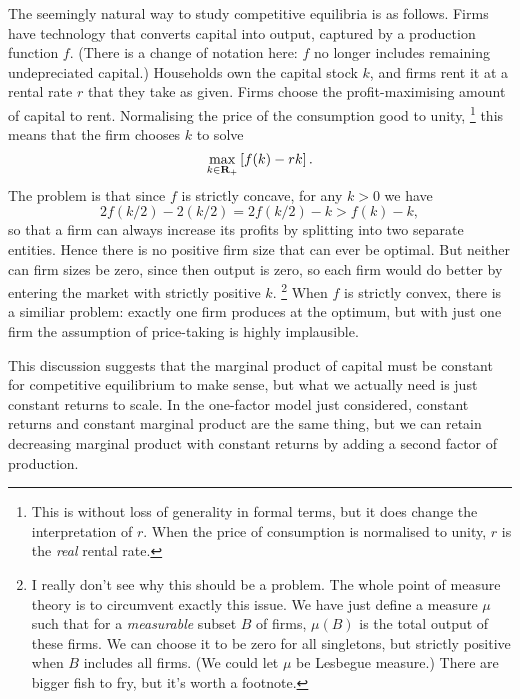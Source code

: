 \documentclass[11pt,letterpaper,reqno,oneside]{article}
\begin{document}
The seemingly natural way to study competitive equilibria is as follows. Firms have technology that converts capital into output, captured by a production function $f$. (There is a change of notation here: $f$ no longer includes remaining undepreciated capital.) Households own the capital stock $k$, and firms rent it at a rental rate $r$ that they take as given. Firms choose the profit-maximising amount of capital to rent. Normalising the price of the consumption good to unity,%
	\footnote{This is without loss of generality in formal terms, but it does change the interpretation of $r$. When the price of consumption is normalised to unity, $r$ is the \emph{real} rental rate.}
this means that the firm chooses $k$ to solve
%
\begin{equation*}
	\max_{k \in \mathbf{R}_+} \left[ f(k) - r k \right] .
\end{equation*}
%
The problem is that since $f$ is strictly concave, for any $k>0$ we have
%
\begin{equation*}
	2 f\left( k/2 \right) - 2(k/2) 
	= 2 f\left( k/2 \right) - k
	> f\left( k \right) - k ,
\end{equation*}
%
so that a firm can always increase its profits by splitting into two separate entities. Hence there is no positive firm size that can ever be optimal. But neither can firm sizes be zero, since then output is zero, so each firm would do better by entering the market with strictly positive $k$.%
	\footnote{I really don't see why this should be a problem. The whole point of measure theory is to circumvent exactly this issue. We have just define a measure $\mu$ such that for a \emph{measurable} subset $B$ of firms, $\mu(B)$ is the total output of these firms. We can choose it to be zero for all singletons, but strictly positive when $B$ includes all firms. (We could let $\mu$ be Lesbegue measure.) There are bigger fish to fry, but it's worth a footnote.}
When $f$ is strictly convex, there is a similiar problem: exactly one firm produces at the optimum, but with just one firm the assumption of price-taking is highly implausible.

This discussion suggests that the marginal product of capital must be constant for competitive equilibrium to make sense, but what we actually need is just constant returns to scale. In the one-factor model just considered, constant returns and constant marginal product are the same thing, but we can retain decreasing marginal product with constant returns by adding a second factor of production.
\end{document}
